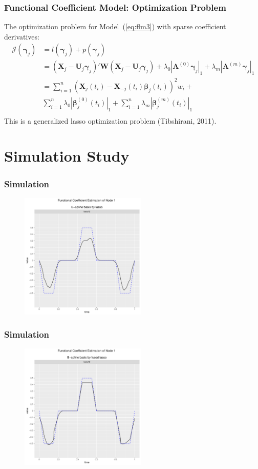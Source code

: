 \documentclass{beamer}
\newcommand{\bX}{\mathbf X}
\newcommand{\bA}{\mathbf A}
\newcommand{\bU}{\mathbf U}
\newcommand{\bW}{\mathbf W}
\newcommand{\bbeta}{{\boldsymbol{\beta}}}
\newcommand{\bgamma}{\boldsymbol{\gamma}}
\begin{document}

\begin{frame}
	\frametitle{Functional Coefficient Model: Optimization Problem}
	The optimization problem for Model~(\ref{eq:flm3}) with sparse coefficient derivatives:
	\begin{equation}
	    \label{eq:opt}
	    \begin{aligned}
	    \mathcal{J}(\bgamma_j) &= l(\bgamma_j) + p (\bgamma_j)\\
	    &= (\bX_j - \bU_j \bgamma_j)'\bW (\bX_j - \bU_j \bgamma_j) + \lambda_0|\bA^{(0)} \bgamma_j|_1 + \lambda_m |\bA^{(m)} \bgamma_j|_1 \\
	    &= \sum_{i = 1}^{n}(\bX_j(t_i) - \bX_{-j}(t_i) \bbeta_j(t_i))^2 w_i +\\ &\sum_{i=1}^{n}\lambda_0|\bbeta_j^{(0)}(t_i)|_1 + \sum_{i=1}^{n}\lambda_m|\bbeta_j^{(m)}(t_i)|_1\\
	    \end{aligned}
	\end{equation}
	This is a generalized lasso optimization problem (Tibshirani, 2011).
\end{frame}	

\section{Simulation Study}
\begin{frame}
	\frametitle{Simulation}
	\begin{figure}
		\includegraphics[height = 6cm]{2dexample_lasso.pdf}
	\end{figure}
\end{frame}
\begin{frame}
	\frametitle{Simulation}
	\begin{figure}
		\includegraphics[height = 6cm]{2dexample_fused_lasso.pdf}
	\end{figure}
\end{frame}
\end{document}
